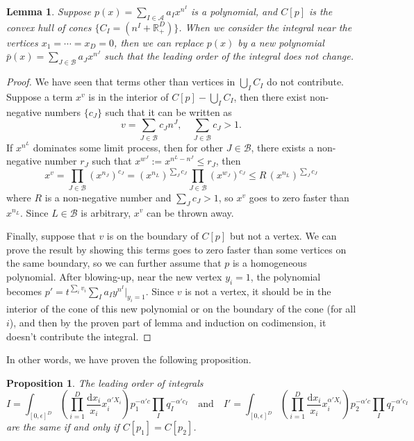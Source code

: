 \documentclass[12pt]{article}
\theoremstyle{definition}
\theoremstyle{plain}
\newtheorem{lem}[para]{Lemma}
\newtheorem{pro}[para]{Proposition}
\newcommand{\dif}{\mathrm{d}} %
\begin{document}
\begin{lem}
Suppose $p(x)=\sum_{I\in \mathscr A}a_I x^{n^I}$ is a polynomial, and $C[p]$ is the convex hull
of cones $\{C_{I}=(n^I+\mathbb R^D_{+})\}$. 
When we consider the integral near the vertices $x_1=\cdots=x_D=0$, 
then we can replace $p(x)$ by a new polynomial $\bar p(x)=\sum_{J\in \mathscr B}a_J x^{n^J}$ such that
the leading order of the integral does not change.
\end{lem}


\begin{proof}
We have seen that terms other than vertices in $\bigcup_I C_I$ do not contribute. Suppose a term $x^v$ 
is in the interior of $C[p]-\bigcup_I C_I$,  
then there exist non-negative numbers $\{c_J\}$ such that it can be written as 
\[
	v = \sum_{J\in \mathscr B}c_J n^J,\quad \sum_{J\in \mathscr B} c_J>1.
\]
If $x^{n^L}$ dominates some limit process, 
then for other $J\in \mathscr B$, there exists a non-negative number $r_J$ such that
$x^{w^J}:=x^{n^L-n^J}\leq r_J$, then 
\[
	x^v = \prod_{J\in\mathscr B} (x^{n_J})^{c_J} = 
	(x^{n_L})^{\sum_J c_J}\prod_{J\in \mathscr B} 
	(x^{w_J})^{c_J}\leq R\,(x^{n_L})^{\sum_J c_J}
\] 
where $R$ is a non-negative number and $\sum_J c_J>1$, so $x^v$ goes to 
zero faster than $x^{n_L}$. Since $L\in \mathscr B$ is arbitrary, $x^v$ can be thrown away.

Finally, suppose that $v$ is on the boundary of $C[p]$ but not a vertex.
We can prove the result by showing this terms goes to zero faster than some vertices on the 
same boundary, so we can further assume that $p$ is a homogeneous polynomial.
After blowing-up, near the new vertex
$y_i=1$, the polynomial becomes $p'=t^{\sum_i v_i}\sum_{I}a_I y^{n^I}|_{y_i=1}$. 
Since $v$ is not a vertex, it should be in the interior of the cone of this new polynomial or 
on the boundary of the cone (for all $i$), and then by 
the proven part of lemma and induction on codimension, it doesn't contribute the integral.
\end{proof}

In other words, we have proven the following proposition. 

\begin{pro}
The leading order of integrals
\[
	I=\int_{[0,\epsilon]^D} \left(\prod_{i=1}^D\frac{\dif x_i}{x_i}x_i^{\alpha' X_i}\right)
	p_1^{-\alpha' c} \prod_I q_I^{-\alpha' c_I}
	\quad \text{and} \quad 
	I'=\int_{[0,\epsilon]^D} \left(\prod_{i=1}^D\frac{\dif x_i}{x_i}x_i^{\alpha' X_i}\right)
	p_2^{-\alpha' c} \prod_I q_I^{-\alpha' c_I}
\]
are the same if and only if $C[p_1]=C[p_2]$.
\end{pro}
\end{document}
